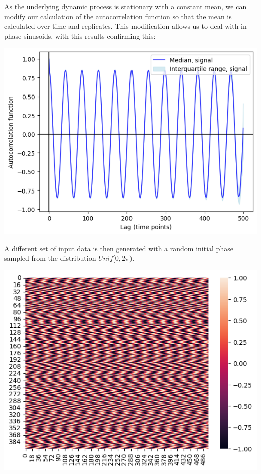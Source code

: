 \begin{enumerate}
\begin{enumerate}
As the underlying dynamic process is stationary with a constant mean, we can modify our calculation of the autocorrelation function so that the mean is calculated over time and replicates.  This modification allows us to deal with in-phase sinusoids, with this results confirming this:
\begin{center}
\includegraphics[width=.9\linewidth]{sinusoids_inphase_acf_stationary.png}
\end{center}

A different set of input data is then generated with a random initial phase sampled from the distribution \(Unif[0,2\pi)\).
\begin{center}
\includegraphics[width=.9\linewidth]{sinusoids_outofphase.png}
\end{center}


\end{enumerate}
\end{enumerate}

